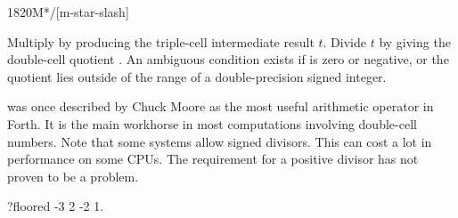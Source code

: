 \begin{worddef}{1820}{M*/}[m-star-slash]
\item {}

	Multiply  by  producing the triple-cell
	intermediate result $t$. Divide $t$ by  giving the
	double-cell quotient . An ambiguous condition exists
	if  is zero or negative, or the quotient lies outside
	of the range of a double-precision signed integer.

	\begin{rationale} %
		 was once described by Chuck Moore as the most
		useful arithmetic operator in Forth. It is the main workhorse
		in most computations involving double-cell numbers. Note that
		some systems allow signed divisors. This can cost a lot in
		performance on some CPUs. The requirement for a positive
		divisor has not proven to be a problem.
	\end{rationale}

	\begin{testing}\ttfamily

		\word{:} ?floored \word{[} -3 2 \word{/} -2 \word{=} \word{]}   1.\   \word{;}

		\small 
		 \\
		 \\ %
		 \\ %
		 \\
		 \\
		 \\ %
		 \\


\end{testing}
\end{worddef}
